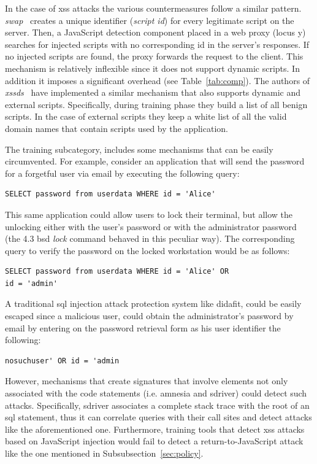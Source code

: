\documentclass[conference]{IEEEtran}
\begin{document}
In the case of {\sc xss} attacks the various countermeasures
follow a similar pattern. {\it {\sc swap}}~\cite{WPLKK09}
creates a unique identifier ({\it script {\sc id}}) for
every legitimate script on the server.
Then, a JavaScript detection component placed in a
web proxy (locus {\sc y}) searches for injected scripts
with no corresponding {\sc id} in the server's responses.
If no injected scripts are found, the proxy forwards the
request to the client. This mechanism is relatively
inflexible since it does not support dynamic scripts.
In addition it imposes a significant overhead (see Table~\ref{tab:comp}).
The authors of {\it {\sc xssds}}~\cite{JEP08}
have implemented a similar mechanism that also supports
dynamic and external scripts. Specifically,
during training phase they build a list of all benign scripts.
In the case of external scripts they keep a white list
of all the valid domain names that contain scripts
used by the application.

The training subcategory, includes some mechanisms
that can be easily circumvented. For example,
consider an application that will send the password 
for a forgetful user via email by executing
the following query:
\bgroup
\lstset{language=SQL}
\begin{small}
\begin{lstlisting}
SELECT password from userdata WHERE id = 'Alice'
\end{lstlisting}
\end{small}
\egroup
\noindent
This same application could allow users to lock their terminal,
but allow the unlocking either with the user's password or with
the administrator password (the 4.3 {\sc bsd} {\em lock} command
behaved in this peculiar way).
The corresponding query to verify the password on the locked
workstation would be as follows:
\bgroup
\lstset{language=SQL}
\begin{small}
\begin{lstlisting}
SELECT password from userdata WHERE id = 'Alice' OR
id = 'admin'
\end{lstlisting}
\end{small}
\egroup
\noindent
A traditional {\sc sql} injection attack protection system like {\sc didafit},
could be easily escaped since a malicious user, could obtain the
administrator's password by email by entering on the password retrieval form
as his user identifier the following:
\bgroup
\lstset{language=SQL}
\begin{small}
\begin{lstlisting}
nosuchuser' OR id = 'admin
\end{lstlisting}
\end{small}
\egroup
\noindent
However, mechanisms that create signatures that involve
elements not only associated with the code statements
(i.e. {\sc amnesia} and {\sc sd}river)
could detect such attacks. Specifically,
{\sc sd}river associates a complete stack trace with the
root of an {\sc sql} statement, thus it can correlate
queries with their call sites and detect attacks
like the aforementioned one.
Furthermore, training tools that detect
{\sc xss} attacks based on JavaScript injection
would fail to detect a return-to-JavaScript attack
like the one mentioned in Subsubsection~\ref{sec:policy}.
\end{document}
